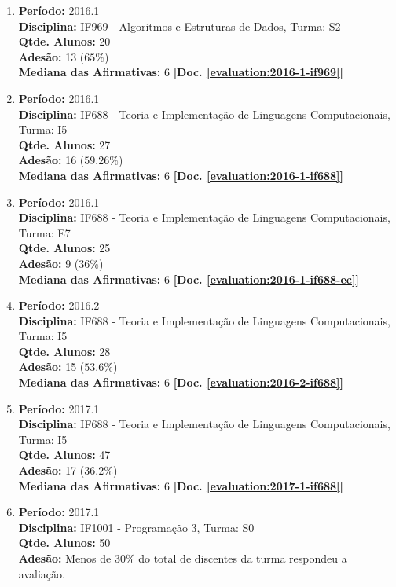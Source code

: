 \documentclass[a4paper,oneside,10pt]{article}
\begin{document}
\begin{enumerate}
\item   \textbf{Período:} 2016.1 \\
        \textbf{Disciplina:} IF969 - Algoritmos e Estruturas de Dados, Turma: S2\\
        \textbf{Qtde. Alunos:} 20\\
        \textbf{Adesão:} 13 ($65\%$)\\
        \textbf{Mediana das Afirmativas:} 6 \textbf{[Doc. \ref{evaluation:2016-1-if969}]}

\item   \textbf{Período:} 2016.1 \\
        \textbf{Disciplina:} IF688 - Teoria e Implementação de Linguagens Computacionais, Turma: I5\\
        \textbf{Qtde. Alunos:} 27\\
        \textbf{Adesão:} 16 ($59.26\%$)\\
        \textbf{Mediana das Afirmativas:} 6 \textbf{[Doc. \ref{evaluation:2016-1-if688}]}

\item   \textbf{Período:} 2016.1 \\
        \textbf{Disciplina:} IF688 - Teoria e Implementação de Linguagens Computacionais, Turma: E7\\
        \textbf{Qtde. Alunos:} 25\\
        \textbf{Adesão:} 9 ($36\%$)\\
        \textbf{Mediana das Afirmativas:} 6 \textbf{[Doc. \ref{evaluation:2016-1-if688-ec}]}

\item   \textbf{Período:} 2016.2 \\
        \textbf{Disciplina:} IF688 - Teoria e Implementação de Linguagens Computacionais, Turma: I5\\
        \textbf{Qtde. Alunos:} 28\\
        \textbf{Adesão:} 15 ($53.6\%$)\\
        \textbf{Mediana das Afirmativas:} 6 \textbf{[Doc. \ref{evaluation:2016-2-if688}]}

\item   \textbf{Período:} 2017.1 \\
        \textbf{Disciplina:} IF688 - Teoria e Implementação de Linguagens Computacionais, Turma: I5\\
        \textbf{Qtde. Alunos:} 47\\
        \textbf{Adesão:} 17 ($36.2\%$)\\
        \textbf{Mediana das Afirmativas:} 6 \textbf{[Doc. \ref{evaluation:2017-1-if688}]}

\item   \textbf{Período:} 2017.1 \\
        \textbf{Disciplina:} IF1001 - Programação 3, Turma: S0\\
        \textbf{Qtde. Alunos:} 50\\
        \textbf{Adesão:} Menos de 30\% do total de discentes da turma respondeu a avaliação.


\end{enumerate}
\end{document}

